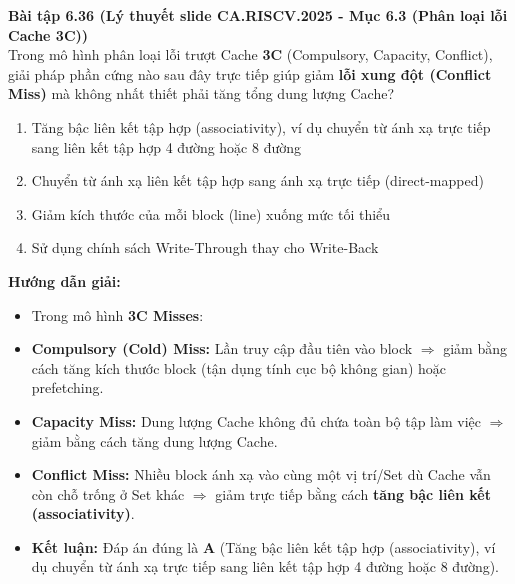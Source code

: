 \textbf{Bài tập 6.36 (Lý thuyết slide CA.RISCV.2025 - Mục 6.3 (Phân loại lỗi Cache 3C))}\\
Trong mô hình phân loại lỗi trượt Cache \textbf{3C} (Compulsory, Capacity, Conflict), giải pháp phần cứng nào sau đây trực tiếp giúp giảm \textbf{lỗi xung đột (Conflict Miss)} mà không nhất thiết phải tăng tổng dung lượng Cache?
\begin{enumerate}[label=\Alph*.]
    \item Tăng bậc liên kết tập hợp (associativity), ví dụ chuyển từ ánh xạ trực tiếp sang liên kết tập hợp 4 đường hoặc 8 đường
    \item Chuyển từ ánh xạ liên kết tập hợp sang ánh xạ trực tiếp (direct-mapped)
    \item Giảm kích thước của mỗi block (line) xuống mức tối thiểu
    \item Sử dụng chính sách Write-Through thay cho Write-Back
\end{enumerate}
\textbf{Hướng dẫn giải:}
\begin{itemize}
    \item Trong mô hình \textbf{3C Misses}:
    \item \textbf{Compulsory (Cold) Miss:} Lần truy cập đầu tiên vào block $\Rightarrow$ giảm bằng cách tăng kích thước block (tận dụng tính cục bộ không gian) hoặc prefetching.
    \item \textbf{Capacity Miss:} Dung lượng Cache không đủ chứa toàn bộ tập làm việc $\Rightarrow$ giảm bằng cách tăng dung lượng Cache.
    \item \textbf{Conflict Miss:} Nhiều block ánh xạ vào cùng một vị trí/Set dù Cache vẫn còn chỗ trống ở Set khác $\Rightarrow$ giảm trực tiếp bằng cách \textbf{tăng bậc liên kết (associativity)}.
    \item \textbf{Kết luận:} Đáp án đúng là \textbf{A} (Tăng bậc liên kết tập hợp (associativity), ví dụ chuyển từ ánh xạ trực tiếp sang liên kết tập hợp 4 đường hoặc 8 đường).
\end{itemize}

